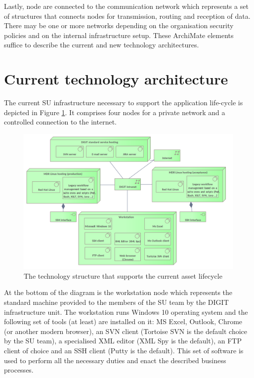 	Lastly, node are connected to the communication network which represents a set of structures that connects nodes for transmission, routing and reception of data. There may be one or more networks depending on the organisation security policies and on the internal infrastructure setup. These ArchiMate elements suffice to describe the current and new technology architectures. 	
	
	\section{Current technology architecture}
	\label{sec:technology-current}
	
	The current SU infrastructure necessary to support the application life-cycle is depicted in Figure \ref{fig:technology-current}. It comprises four nodes for a private network and a controlled connection to the internet. 
	
	\begin{figure}[!h]
		\centering
		\includegraphics[width=1.01\textwidth]{images/technology/Current Platform.png}
		\caption{The technology structure that supports the current asset lifecycle}
		\label{fig:technology-current}
	\end{figure}
	
	At the bottom of the diagram is the workstation node which represents the standard machine provided to the members of the SU team by the DIGIT infrastructure unit. The workstation runs Windows 10 operating system and the following set of tools (at least) are installed on it: MS Excel, Outlook, Chrome (or another modern browser), an SVN client (Tortoise SVN is the default choice by the SU team), a specialised XML editor (XML Spy is the default), an FTP client of choice and an SSH client (Putty is the default). This set of software is used to perform all the necessary duties and enact the described business processes. 
	
